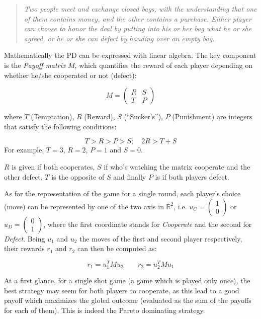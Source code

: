 \documentclass[journal,a4paper,10pt,twoside,draft]{IEEEtran}
\begin{document}
\begin{quote}
\textit{Two people meet and exchange closed bags, with the understanding that one of them contains money, and the other contains a purchase. Either player can choose to honor the deal by putting into his or her bag what he or she agreed, or he or she can defect by handing over an empty bag.}
\end{quote}

Mathematically the PD can be expressed with linear algebra. The key component is the \textit{Payoff matrix} $M$, which quantifies the reward of each player depending on whether he/she cooperated or not (defect):

$$
M = 
\begin{pmatrix} 
R & S \\
T & P 
\end{pmatrix}
$$

where $T$ (Temptation), $R$ (Reward), $S$ (``Sucker's''), $P$ (Punishment) are integers that satisfy the following conditions:

$$
T>R>P>S; \quad 2R > T+S 
$$
For example, $T=3$, $R=2$, $P=1$ and $S=0$.

$R$ is given if both cooperates, $S$ if who's watching the matrix cooperate and the other defect, $T$ is the opposite of $S$ and finally $P$ is if both players defect.

As for the representation of the game for a single round, each player's choice (move) can be represented by one of the two axis in $\mathbb{R}^2$, i.e. $u_C=\begin{pmatrix} 1 \\ 0 \end{pmatrix}$ or $u_D=\begin{pmatrix} 0 \\ 1 \end{pmatrix}$, where the first coordinate stands for \textit{Cooperate} and the second for \textit{Defect}. Being $u_1$ and $u_2$ the moves of the first and second player respectively, their rewards $r_1$ and $r_2$ can then be computed as:

$$
r_1 = u_1^T M u_2
\quad
\quad
r_2 = u_2^T M u_1
$$

At a first glance, for a single shot game (a game which is played only once), the best strategy may seem for both players to cooperate, as this lead to a good payoff which maximizes the global outcome (evaluated as the sum of the payoffs for each of them). This is indeed the Pareto dominating strategy. 
\end{document}
